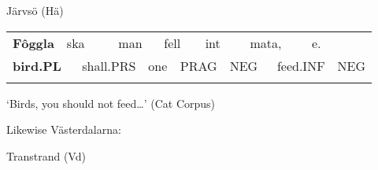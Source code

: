 
\begin{styleExLtrTblii}
Järvsö (Hä)

\end{styleExLtrTblii}

\begin{tabular}{llllllllllllll}
\lsptoprule
{\bfseries Fôggla} & \multicolumn{2}{l}{ska

} & \multicolumn{2}{l}{man

} & \multicolumn{2}{l}{fell

} & \multicolumn{2}{l}{int

} & \multicolumn{2}{l}{mata,

} & \multicolumn{2}{l}{e.

} & \\
\multicolumn{2}{l}{{\bfseries bird.PL}

} & \multicolumn{2}{l}{shall.PRS

} & \multicolumn{2}{l}{one

} & \multicolumn{2}{l}{PRAG

} & \multicolumn{2}{l}{NEG

} & \multicolumn{2}{l}{feed.INF

} & \multicolumn{2}{l}{NEG

}\\
\lspbottomrule
\end{tabular}

\begin{styleTranslation}
‘Birds, you should not feed…’ (Cat Corpus)

\end{styleTranslation}

Likewise Västerdalarna:


\begin{listWWNumileveli}
\item 

\begin{styleExample}
Transtrand (Vd) 

\end{styleExample}

\end{listWWNumileveli}

